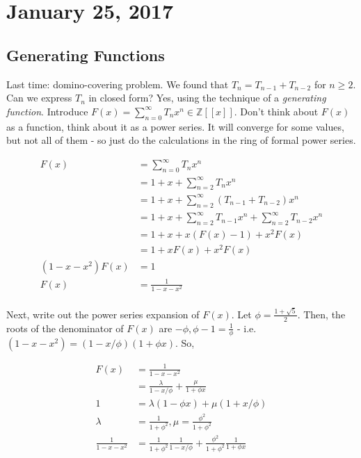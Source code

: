 \documentclass[12pt]{article}
\theoremstyle{definition}
\begin{document}
\section{January 25, 2017}

\subsection{Generating Functions}

Last time: domino-covering problem. We found that $T_n = T_{n-1} + T_{n-2}$ for
$n \ge 2$. Can we express $T_n$ in closed form? Yes, using the technique of a
\textit{generating function}. Introduce $F(x) = \sum_{n=0}^\infty T_nx^n \in
\mathbb{Z}[[x]]$. Don't think about $F(x)$ as a function, think about it as a
power series. It will converge for some values, but not all of them - so just
do the calculations in the ring of formal power series. 

\begin{align*}
F(x) &= \sum_{n=0}^\infty T_nx^n \\
 &= 1 + x + \sum_{n=2}^\infty T_nx^n \\
 &= 1 + x + \sum_{n=2}^\infty(T_{n-1} + T_{n-2})x^n \\
 &= 1 + x + \sum_{n=2}^\infty T_{n-1}x^n + \sum_{n=2}^\infty T_{n-2}x^n\\
 &= 1 + x + x(F(x) - 1) + x^2F(x)\\
 &= 1 + xF(x) + x^2F(x) \\
 (1 - x - x^2)F(x) &= 1 \\
 F(x) &= \frac{1}{1-x-x^2}\\
\end{align*}

Next, write out the power series expansion of $F(x)$. Let $\phi = \frac{1
    +\sqrt{5}}{2}$. Then, the roots of the denominator of $F(x)$ are $-\phi,
    \phi - 1 = \frac{1}{\phi}$ - i.e. $(1 - x - x^2) = (1 - x/\phi)(1 + \phi
    x)$. So, 

\begin{align*}
F(x) &= \frac{1}{1 - x - x^2}\\
&= \frac{\lambda}{1 - x/\phi} + \frac{\mu}{1 + \phi x}\\
1 &= \lambda(1 - \phi x ) + \mu(1 + x/\phi)\\
\lambda &= \frac{1}{1 + \phi^2}, \mu = \frac{\phi^2}{1 + \phi^2}\\
\frac{1}{1-x-x^2} &= \frac{1}{1 + \phi^2} \frac{1}{1 - x/\phi} +
\frac{\phi^2}{1 + \phi^2} \frac{1}{1 + \phi x}
\end{align*}
\end{document}
